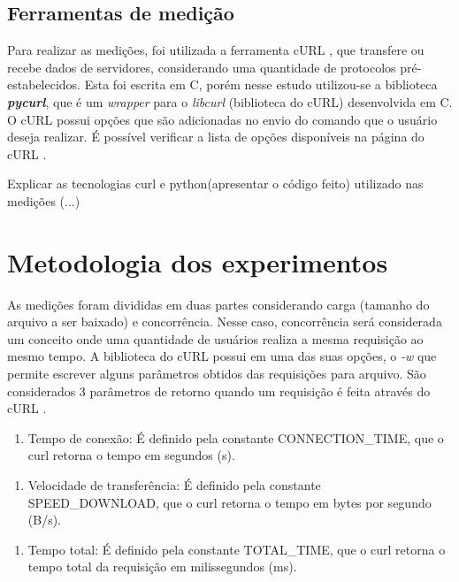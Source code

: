 \documentclass[conference,compsoc]{IEEEtran}
\begin{document}
\subsection{Ferramentas de medição}
Para realizar as medições, foi utilizada a ferramenta cURL \cite{curl_manpage}, que transfere ou recebe dados de servidores, considerando uma quantidade de protocolos pré-estabelecidos. Esta foi escrita em C, porém nesse estudo utilizou-se a biblioteca \textit{\textbf{pycurl}}, que é um \textit{wrapper} para o \textit{libcurl} (biblioteca do cURL) desenvolvida em C. O cURL possui opções que são adicionadas no envio do comando que o usuário deseja realizar. É possível verificar a lista de opções disponíveis na página do cURL \cite{curl_manpage}. 

Explicar as tecnologias curl e python(apresentar o código feito) utilizado nas medições (...)

\section{Metodologia dos experimentos}
As medições foram divididas em duas partes considerando carga (tamanho do arquivo a ser baixado) e concorrência. Nesse caso, concorrência será considerada um conceito onde uma quantidade de usuários realiza a mesma requisição ao mesmo tempo. A biblioteca do cURL possui em uma das suas opções, o \textit{-w} que permite escrever alguns parâmetros obtidos das requisições para arquivo. São considerados 3 parâmetros de retorno quando um requisição é feita através do cURL \cite{curl_manpage}. 

\vspace{3mm}
\begin{enumerate}
	\item Tempo de conexão: É definido pela constante CONNECTION\_TIME, que o curl retorna o tempo em segundos (s).
\end{enumerate}
\vspace{3mm}

\begin{enumerate}[resume]
	\item Velocidade de transferência: É definido pela constante SPEED\_DOWNLOAD, que o curl retorna o tempo em bytes por segundo (B/s).
\end{enumerate}
\vspace{3mm}

\begin{enumerate}[resume]
\item Tempo total: É definido pela constante TOTAL\_TIME, que o curl retorna o tempo total da requisição em milissegundos (ms).
\end{enumerate}
\end{document}
